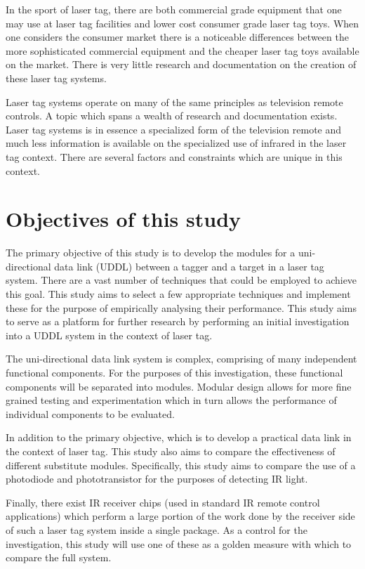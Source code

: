 In the sport of laser tag, there are both commercial grade equipment that one may use at laser tag facilities and lower cost consumer grade laser tag toys. When one considers the consumer market there is a noticeable differences between the more sophisticated commercial equipment and the cheaper laser tag toys available on the market. There is very little research and documentation on the creation of these laser tag systems.

Laser tag systems operate on many of the same principles as television remote controls. A topic which spans a wealth of research and documentation exists. Laser tag systems is in essence a specialized form of the television remote and much less information is available on the specialized use of infrared in the laser tag context. There are several factors and constraints which are unique in this context.



\section{Objectives of this study}

The primary objective of this study is to develop the modules for a uni-directional data link (UDDL) between a tagger and a target in a laser tag system. There are a vast number of techniques that could be employed to achieve this goal. This study aims to select a few appropriate techniques and implement these for the purpose of empirically analysing their performance. This study aims to serve as a platform for further research by performing an initial investigation into a UDDL system in the context of laser tag.

The uni-directional data link system is complex, comprising of many independent functional components. For the purposes of this investigation, these functional components will be separated into modules. Modular design allows for more fine grained testing and experimentation which in turn allows the performance of individual components to be evaluated.

In addition to the primary objective, which is to develop a practical data link in the context of laser tag. This study also aims to compare the effectiveness of different substitute modules. Specifically, this study aims to compare the use of a photodiode and phototransistor for the purposes of detecting IR light.

Finally, there exist IR receiver chips (used in standard IR remote control applications) which perform a large portion of the work done by the receiver side of such a laser tag system inside a single package. As a control for the investigation, this study will use one of these as a golden measure with which to compare the full system.

